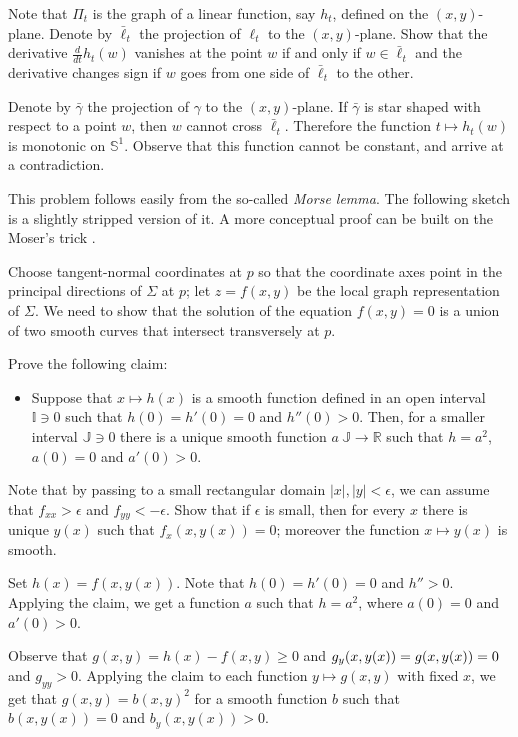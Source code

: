 Note that $\Pi_t$ is the graph of a linear function, say $h_t$, defined on the $(x, y)$-plane.
Denote by $\bar\ell_t$ the projection of $\ell_t$ to the $(x, y)$-plane.
Show that the derivative $\tfrac{d}{dt}h_t(w)$ vanishes at the point $w$ if and only if $w\in \bar\ell_t$ 
and the derivative changes sign if $w$ goes from one side of $\bar\ell_t$ to the other.

Denote by $\bar\gamma$ the projection of $\gamma$ to the $(x, y)$-plane.
If $\bar\gamma$ is star shaped with respect to a point $w$, then $w$ cannot cross $\bar\ell_t$.
Therefore the function $t\mapsto h_t(w)$ is monotonic on $\mathbb{S}^1$.
Observe that this function cannot be constant, and arrive at a contradiction.

This problem follows easily from the so-called \emph{Morse lemma}.
The following sketch is a slightly stripped version of it.
A more conceptual proof can be built on the Moser's trick \cite{palais}.

\medskip

Choose tangent-normal coordinates at $p$ so that the coordinate axes point in the principal directions of $\Sigma$ at $p$;
let $z=f(x,y)$ be the local graph representation of $\Sigma$.
We need to show that the solution of the equation $f(x,y)=0$ is a union of two smooth curves that intersect transversely at $p$.

Prove the following claim:
\begin{itemize}
 \item Suppose that  $x\mapsto h(x)$ is a smooth function defined in an open interval $\mathbb{I}\ni0$ such that $h(0)=h'(0)=0$ and $h''(0)>0$.
 Then, for a smaller interval $\mathbb{J}\ni0$ there is a unique smooth function $a\:\mathbb{J}\to\mathbb{R}$ such that $h=a^2$, $a(0)=0$ and $a'(0)> 0$.
\end{itemize}
Note that by passing to a small rectangular domain $|x|,|y|<\epsilon$, we can assume that $f_{xx}>\epsilon$ and $f_{yy}<-\epsilon$. 
Show that if $\epsilon$ is small, then for every $x$ there is unique $y(x)$ such that $f_x(x,y(x))=0$; 
moreover the function $x\mapsto y(x)$ is smooth.

Set $h(x)=f(x,y(x))$.
Note that $h(0)=h'(0)=0$ and $h''>0$.
Applying the claim, we get a function $a$ such that $h=a^2$, where $a(0)=0$ and $a'(0)>0$.

Observe that $g(x,y)=h(x)-f(x,y)\ge 0$ and $g_y(x,y(x))\z=g(x,y(x))\z=0$ and $g_{yy}>0$.
Applying the claim to each function $y\mapsto g(x,y)$ with fixed $x$, we get that $g(x,y)=b(x,y)^2$ for a smooth function $b$ such that 
$b(x,y(x))=0$ and $b_y(x,y(x))>0$.

